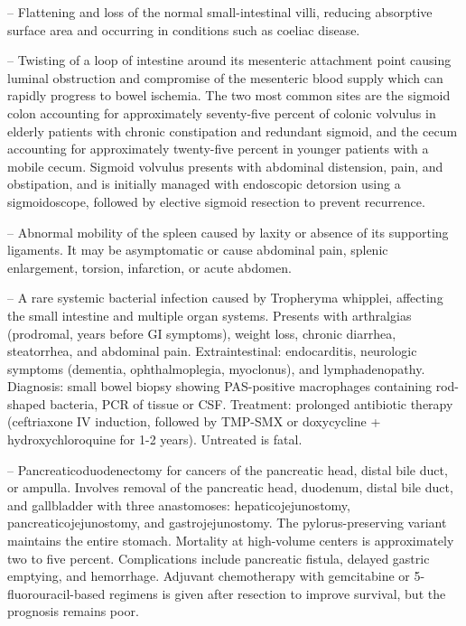 -- Flattening and loss of the normal small-intestinal villi, reducing absorptive surface area and occurring in conditions such as coeliac disease.

-- Twisting of a loop of intestine around its mesenteric attachment point causing luminal obstruction and compromise of the mesenteric blood supply which can rapidly progress to bowel ischemia. The two most common sites are the sigmoid colon accounting for approximately seventy-five percent of colonic volvulus in elderly patients with chronic constipation and redundant sigmoid, and the cecum accounting for approximately twenty-five percent in younger patients with a mobile cecum. Sigmoid volvulus presents with abdominal distension, pain, and obstipation, and is initially managed with endoscopic detorsion using a sigmoidoscope, followed by elective sigmoid resection to prevent recurrence.

-- Abnormal mobility of the spleen caused by laxity or absence of its supporting ligaments. It may be asymptomatic or cause abdominal pain, splenic enlargement, torsion, infarction, or acute abdomen.

-- A rare systemic bacterial infection caused by Tropheryma whipplei, affecting the small intestine and multiple organ systems. Presents with arthralgias (prodromal, years before GI symptoms), weight loss, chronic diarrhea, steatorrhea, and abdominal pain. Extraintestinal: endocarditis, neurologic symptoms (dementia, ophthalmoplegia, myoclonus), and lymphadenopathy. Diagnosis: small bowel biopsy showing PAS-positive macrophages containing rod-shaped bacteria, PCR of tissue or CSF. Treatment: prolonged antibiotic therapy (ceftriaxone IV induction, followed by TMP-SMX or doxycycline + hydroxychloroquine for 1-2 years). Untreated is fatal.

-- Pancreaticoduodenectomy for cancers of the pancreatic head, distal bile duct, or ampulla. Involves removal of the pancreatic head, duodenum, distal bile duct, and gallbladder with three anastomoses: hepaticojejunostomy, pancreaticojejunostomy, and gastrojejunostomy. The pylorus-preserving variant maintains the entire stomach. Mortality at high-volume centers is approximately two to five percent. Complications include pancreatic fistula, delayed gastric emptying, and hemorrhage. Adjuvant chemotherapy with gemcitabine or 5-fluorouracil-based regimens is given after resection to improve survival, but the prognosis remains poor.

